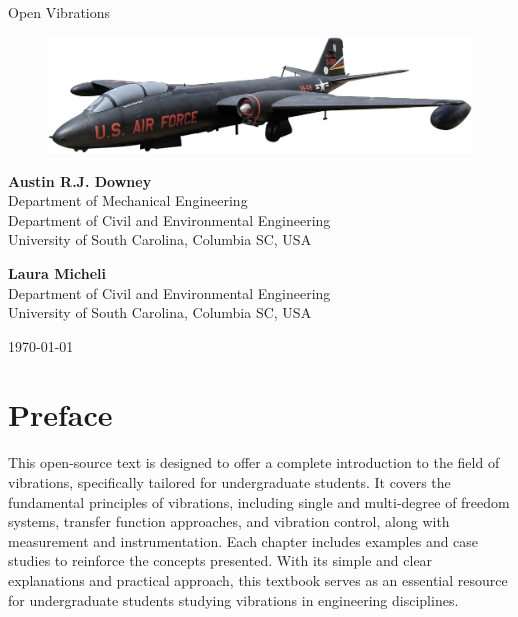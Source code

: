 \documentclass[12pt,letter]{article}
\begin{document}
\thispagestyle{empty}	

\begin{center}
	{\fontsize{50}{60}\selectfont Open Vibrations}
	
	\vspace{3cm}
	
	\begin{figure}[H]
		\includegraphics[width=6.5in]{figures/Martin_B-57_Canberra.png}
		\label{fig:title_figure}
	\end{figure} 
	
	\vspace{4cm}
	
	\textbf{Austin R.J. Downey}\\ Department of Mechanical Engineering \\ Department of Civil and Environmental Engineering \\ University of South Carolina, Columbia SC, USA 
	
	\vspace{1cm}
	
	\textbf{Laura Micheli}\\ Department of Civil and Environmental Engineering \\ University of South Carolina, Columbia SC, USA 
	



	\vspace*{\fill}
	
	\today


\end{center}

\pagebreak

\pagebreak
\setcounter{page}{1}
\tableofcontents

\pagebreak

\setcounter{secnumdepth}{0} %

\section{Preface}
This open-source text is designed to offer a complete introduction to the field of vibrations, specifically tailored for undergraduate students. It covers the fundamental principles of vibrations, including single and multi-degree of freedom systems, transfer function approaches, and vibration control, along with measurement and instrumentation. Each chapter includes examples and case studies to reinforce the concepts presented. With its simple and clear explanations and practical approach, this textbook serves as an essential resource for undergraduate students studying vibrations in engineering disciplines.
\end{document}
